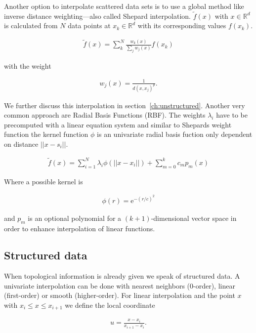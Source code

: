 Another option to interpolate scattered data sets is to use a global method like inverse distance weighting---also called Shepard interpolation. $\widetilde{f}(x)$ with $x \in \mathbb{R}^d$ is calculated from $N$ data points at $x_k \in \mathbb{R}^d$ with its corresponding values $f(x_k)$.

\begin{align}
\widetilde{f}(x) = \sum_{k}^{N}\frac{w_k(x)}{\sum\nolimits_{j}w_j(x)}f(x_k)
\end{align}

with the weight

\begin{align}
w_j(x) = \frac{1}{d(x, x_j)^p}.
\end{align}

We further discuss this interpolation in section~\ref{ch:unstructured}. Another very common approach are Radial Basis Functions (RBF). The weights $\lambda_i$ have to be precomputed with a linear equation system and similar to Shepards weight function the kernel function $\phi$ is an univariate radial basis fuction only dependent on distance $||x-s_i||$. 

\begin{align}
\widetilde{f}(x) = \sum_{i=1}^N \lambda_i \phi(||x - x_i||) + \sum_{m=0}^k c_m p_m (x)
\end{align}

Where a possible kernel is 

\begin{align}
\phi(r) = \mathrm{e}^{-(r/c)^2}
\end{align}

and $p_m$ is an optional polynomial for a $(k+1)$-dimensional vector space in order to enhance interpolation of linear functions.

\subsection{Structured data}
\label{ch:fu:trilinear}

When topological information is already given we speak of structured data. A univariate interpolation can be done with nearest neighbors (0-order), linear (first-order) or smooth (higher-order). For linear interpolation and the point $x$ with $x_i \leq x \leq x_{i+1}$ we define the local coordinate

\begin{align}
u = \frac{x-x_i}{x_{i+1}-x_i}.
\end{align}

